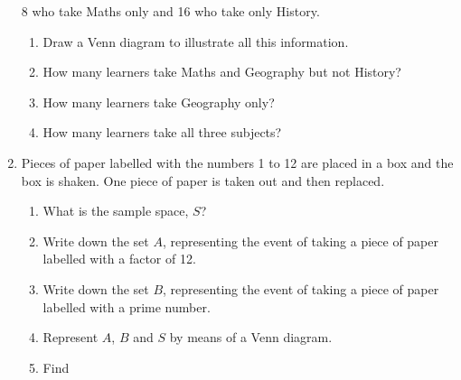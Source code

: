 \begin{enumerate}[noitemsep, label=\textbf{\arabic*}. ]
8 who take Maths only and 16 who take only History.
\label{m39377*id111373}\begin{enumerate}[noitemsep, label=\textbf{\alph*}. ] 
            \label{m39377*uid20}\item Draw a Venn diagram to illustrate
all this information.
\label{m39377*uid21}\item How many learners take Maths and Geography but not
History?
\label{m39377*uid22}\item How many learners take Geography only?
\label{m39377*uid23}\item How many learners take all three subjects?
\end{enumerate}
                \label{m39377*uid24}\item Pieces of paper labelled with the numbers 1 to 12
are placed in a box and the box is shaken. One piece of paper is taken out and
then replaced.
\label{m39377*id111437}\begin{enumerate}[noitemsep, label=\textbf{\alph*}. ] 
            \label{m39377*uid25}\item What is the sample space, \begin{math}S\end{math}?
\label{m39377*uid26}\item Write down the set \begin{math}A\end{math}, representing the event of taking a
piece of paper labelled with a factor of 12.
\label{m39377*uid27}\item Write down the set \begin{math}B\end{math}, representing the event of taking a
piece of paper labelled with a prime number.
\label{m39377*uid28}\item Represent \begin{math}A\end{math}, \begin{math}B\end{math} and \begin{math}S\end{math} by means of a Venn diagram.
\label{m39377*uid29}\item Find
\label{m39377*id111546}\begin{enumerate}[noitemsep, label=\textbf{\roman*}. ] 

\end{enumerate}
\end{enumerate}
\end{enumerate}
